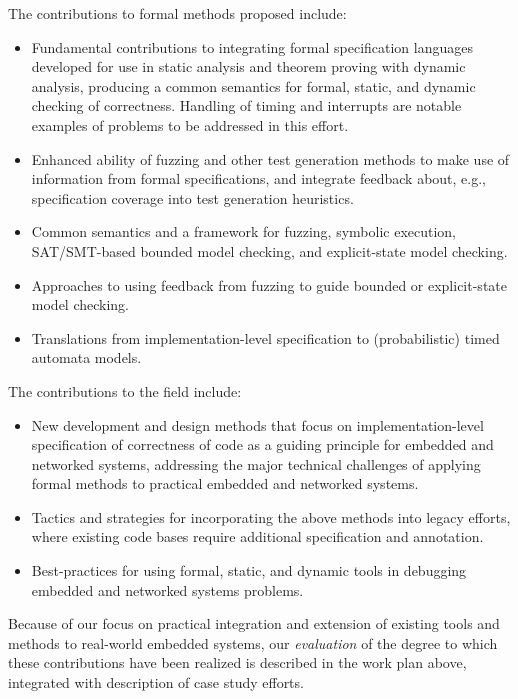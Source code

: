 The contributions to formal methods proposed include:

\begin{itemize}
\item Fundamental contributions to integrating formal specification
languages developed for use in static analysis and theorem proving
with dynamic analysis, producing a common semantics for formal,
static, and dynamic checking of correctness.  Handling of timing and
interrupts are notable examples of problems to be addressed in this effort.
\item Enhanced ability of fuzzing and other test generation methods to
make use of information from formal specifications, and integrate
feedback about, e.g., specification coverage into test generation
heuristics.
\item Common semantics and a framework for fuzzing, symbolic execution, SAT/SMT-based
bounded model checking, and explicit-state model checking.
\item Approaches to using feedback from fuzzing to guide bounded or explicit-state model
checking.
\item Translations from implementation-level specification to
(probabilistic) timed automata models.
\end{itemize}

The contributions to the field include:

\begin{itemize}
\item New development and design methods that focus on
implementation-level specification of correctness of code as a guiding
principle for embedded and networked systems, addressing the major technical challenges of applying formal methods to practical embedded and networked systems.
\item Tactics and strategies for incorporating the above methods into
legacy efforts, where existing code bases require additional
specification and annotation.
\item Best-practices for using formal, static, and dynamic tools in
  debugging %
  embedded and networked systems problems.
\end{itemize}


Because of our focus on practical integration and extension of
existing tools and methods to real-world embedded systems,
our \emph{evaluation} of the degree to which these contributions have
been realized is described in the work plan above, integrated with
description of case study efforts.